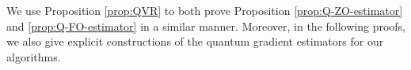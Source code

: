 






We use Proposition \ref{prop:QVR} to both prove Proposition \ref{prop:Q-ZO-estimator} and \ref{prop:Q-FO-estimator} in a similar manner. Moreover, in the following proofs, we also give explicit constructions of the quantum gradient estimators for our algorithms.


